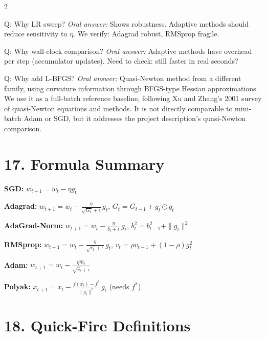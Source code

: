 \documentclass[a4paper,9pt]{article}
\newcommand{\oral}{\textit{\color{darkgray}Oral answer: }}
\begin{document}
\begin{multicols}{2}
\begin{qa}{Q: Why LR sweep?}
\oral Shows robustness. Adaptive methods should reduce sensitivity to \(\eta\).
We verify: Adagrad robust, RMSprop fragile.
\end{qa}

\begin{qa}{Q: Why wall-clock comparison?}
\oral Adaptive methods have overhead per step (accumulator updates).
Need to check: still faster in real seconds?
\end{qa}

\begin{qa}{Q: Why add L-BFGS?}
\oral Quasi-Newton method from a different family, using curvature information through BFGS-type Hessian approximations.
We use it as a full-batch reference baseline, following Xu and Zhang's 2001 survey of quasi-Newton equations and methods.
It is not directly comparable to mini-batch Adam or SGD, but it addresses the project description's quasi-Newton comparison.
\end{qa}

\section{17. Formula Summary}

\begin{tcolorbox}[title=\textbf{All Updates at a Glance}, colback=unibaselteal!12]
\textbf{SGD:} \(w_{t+1}=w_t-\eta g_t\)

\textbf{Adagrad:} \(w_{t+1} = w_t - \frac{\eta}{\sqrt{G_t}+\epsilon}\, g_t\), \;  \(G_t=G_{t-1}+g_t \odot g_t\)

\textbf{AdaGrad-Norm:} \(w_{t+1} = w_t - \frac{\eta}{b_t+\epsilon}\, g_t\), \; \(b_t^2=b_{t-1}^2+\|g_t\|^2\)

\textbf{RMSprop:} \(w_{t+1} = w_t - \frac{\eta}{\sqrt{v_t}+\epsilon}\, g_t\), \; \(v_t=\rho v_{t-1}+(1-\rho)g_t^2\)

\textbf{Adam:} \(w_{t+1} = w_t - \frac{\eta\hat m_t}{\sqrt{\hat v_t}+\epsilon}\)

\textbf{Polyak:} \(x_{t+1} = x_t - \frac{f(x_t)-f^*}{\|g_t\|^2}\, g_t\) \quad (needs \(f^*\))
\end{tcolorbox}

\section{18. Quick-Fire Definitions}


\end{multicols}
\end{document}
